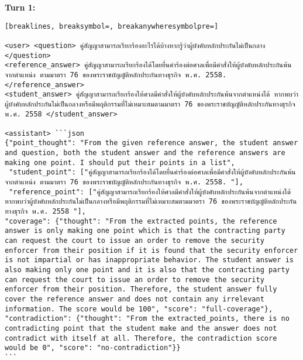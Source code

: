 \textbf{Turn 1: }
\begin{Verbatim}[breaklines, breaksymbol=, breakanywheresymbolpre=]

<user> <question> คู่สัญญาสามารถเรียกร้องอะไรได้บ้างหากรู้ว่าผู้บังคับหลักประกันไม่เป็นกลาง </question>
<reference_answer> คู่สัญญาสามารถเรียกร้องได้โดยยื่นคำร้องต่อศาลเพื่อมีคำสั่งให้ผู้บังคับหลักประกันพ้นจากตำแหน่ง ตามมาตรา 76 ของพระราชบัญญัติหลักประกันทางธุรกิจ พ.ศ. 2558. </reference_answer>
<student_answer> คู่สัญญาสามารถเรียกร้องให้ศาลมีคำสั่งให้ผู้บังคับหลักประกันพ้นจากตำแหน่งได้ หากพบว่าผู้บังคับหลักประกันไม่เป็นกลางหรือมีพฤติกรรมที่ไม่เหมาะสมตามมาตรา 76 ของพระราชบัญญัติหลักประกันทางธุรกิจ พ.ศ. 2558 </student_answer>

<assistant> ```json
{"point_thought": "From the given reference answer, the student answer and question, both the student answer and the reference answers are making one point. I should put their points in a list",
 "student_point": ["คู่สัญญาสามารถเรียกร้องได้โดยยื่นคำร้องต่อศาลเพื่อมีคำสั่งให้ผู้บังคับหลักประกันพ้นจากตำแหน่ง ตามมาตรา 76 ของพระราชบัญญัติหลักประกันทางธุรกิจ พ.ศ. 2558. "],
 "reference_point": ["คู่สัญญาสามารถเรียกร้องให้ศาลมีคำสั่งให้ผู้บังคับหลักประกันพ้นจากตำแหน่งได้ หากพบว่าผู้บังคับหลักประกันไม่เป็นกลางหรือมีพฤติกรรมที่ไม่เหมาะสมตามมาตรา 76 ของพระราชบัญญัติหลักประกันทางธุรกิจ พ.ศ. 2558 "],
"coverage": {"thought": "From the extracted points, the reference answer is only making one point which is that the contracting party can request the court to issue an order to remove the security enforcer from their position if it is found that the security enforcer is not impartial or has inappropriate behavior. The student answer is also making only one point and it is also that the contracting party can request the court to issue an order to remove the security enforcer from their position. Therefore, the student answer fully cover the reference answer and does not contain any irrelevant information. The score would be 100", "score": "full-coverage"}, "contradiction": {"thought": "From the extracted_points, there is no contradicting point that the student make and the answer does not contradict with itself at all. Therefore, the contradiction score would be 0", "score": "no-contradiction"}}
```



\end{Verbatim}

